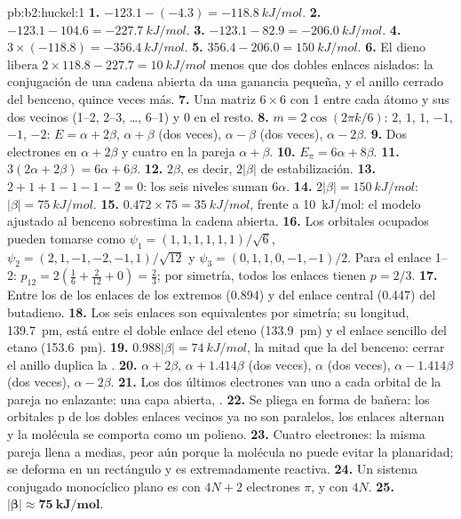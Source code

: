 \begin{solution}{pb:b2:huckel:1}
\textbf{1.} $-123.1 - (-4.3) = \qty{-118.8}{kJ/mol}$.
\textbf{2.} $-123.1 - 104.6 = \qty{-227.7}{kJ/mol}$.
\textbf{3.} $-123.1 - 82.9 = \qty{-206.0}{kJ/mol}$.
\textbf{4.} $3 \times (-118.8) = \qty{-356.4}{kJ/mol}$.
\textbf{5.} $356.4 - 206.0 = \qty{150}{kJ/mol}$.
\textbf{6.} El dieno libera $2 \times 118.8 - 227.7 = \qty{10}{kJ/mol}$ menos que dos
dobles enlaces aislados: la conjugación de una cadena abierta da una ganancia pequeña, y el anillo
cerrado del benceno, quince veces más.
\textbf{7.} Una matriz $6 \times 6$ con 1 entre cada átomo y sus dos vecinos (1--2, 2--3,
\dots, 6--1) y 0 en el resto.
\textbf{8.} $m = 2\cos(2\pi k/6)$: $2$, $1$, $1$, $-1$, $-1$, $-2$: $E = \alpha + 2\beta$, $\alpha + \beta$ (dos veces),
$\alpha - \beta$ (dos veces), $\alpha - 2\beta$.
\textbf{9.} Dos electrones en $\alpha + 2\beta$ y cuatro en la pareja $\alpha + \beta$.
\textbf{10.} $E_\pi = 6\alpha + 8\beta$.
\textbf{11.} $3(2\alpha + 2\beta) = 6\alpha + 6\beta$.
\textbf{12.} $2\beta$, es decir, $2|\beta|$ de estabilización.
\textbf{13.} $2 + 1 + 1 - 1 - 1 - 2 = 0$: los seis niveles suman $6\alpha$.
\textbf{14.} $2|\beta| = \qty{150}{kJ/mol}$: $|\beta| = \qty{75}{kJ/mol}$.
\textbf{15.} $0.472 \times 75 = \qty{35}{kJ/mol}$, frente a \qty{10}{kJ/mol}: el modelo ajustado
al benceno sobrestima la cadena abierta.
\textbf{16.} Los orbitales ocupados pueden tomarse como $\psi_1 = (1, 1, 1, 1, 1, 1)/\sqrt6$,
$\psi_2 = (2, 1, -1, -2, -1, 1)/\sqrt{12}$ y $\psi_3 = (0, 1, 1, 0, -1, -1)/2$. Para el enlace
1--2: $p_{12} = 2(\frac16 + \frac{2}{12} + 0) = \frac23$; por simetría, todos los enlaces tienen $p = 2/3$.
\textbf{17.} Entre los de los enlaces de los extremos (0.894) y del enlace central (0.447) del butadieno.
\textbf{18.} Los seis enlaces son equivalentes por simetría; su longitud, \qty{139.7}{pm}, está
entre el doble enlace del eteno (\qty{133.9}{pm}) y el enlace sencillo del etano
(\qty{153.6}{pm}).
\textbf{19.} $0.988|\beta| = \qty{74}{kJ/mol}$, la mitad que la del benceno: cerrar el anillo duplica la
.
\textbf{20.} $\alpha + 2\beta$, $\alpha + 1.414\beta$ (dos veces), $\alpha$ (dos veces), $\alpha - 1.414\beta$ (dos veces),
$\alpha - 2\beta$.
\textbf{21.} Los dos últimos electrones van uno a cada orbital de la pareja no enlazante: una capa
abierta, .
\textbf{22.} Se pliega en forma de bañera: los orbitales p de los dobles enlaces vecinos ya no son
paralelos, los enlaces alternan y la molécula se comporta como un polieno.
\textbf{23.} Cuatro electrones: la misma pareja llena a medias, peor aún porque la molécula no puede
evitar la planaridad; se deforma en un rectángulo y es extremadamente reactiva.
\textbf{24.} Un sistema conjugado monocíclico plano es  con $4N + 2$ electrones $\pi$,
y  con $4N$.
\textbf{25.} $\boldsymbol{|\beta| \approx \qty{75}{kJ/mol}}$.
\end{solution}
